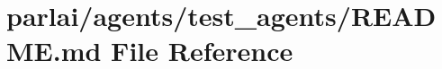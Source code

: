 \hypertarget{parlai_2agents_2test__agents_2README_8md}{}\section{parlai/agents/test\+\_\+agents/\+R\+E\+A\+D\+ME.md File Reference}
\label{parlai_2agents_2test__agents_2README_8md}
